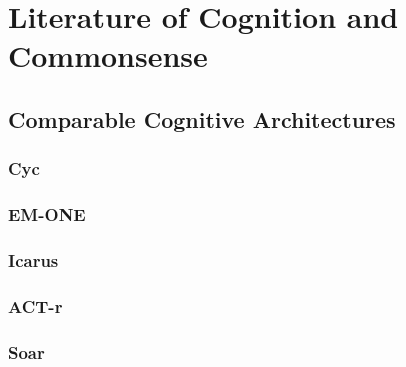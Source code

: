 \chapter{Literature of Cognition and Commonsense}\label{ch:literature_of_cognition_and_commonsense}

\section{Comparable Cognitive Architectures}

\subsection{Cyc}
\subsection{EM-ONE}
\subsection{Icarus}
\subsection{ACT-r}
\subsection{Soar}

